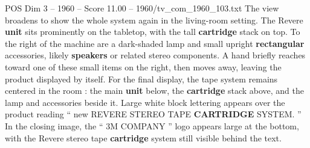 \begin{textsample}{POS Dim 3 – 1960 – Score 11.00 – 1960/tv\_com\_1960\_103.txt}
The view broadens to show the whole system again in the living-room setting.
The Revere \textbf{unit} sits prominently on the tabletop, with the tall \textbf{cartridge} stack on top.
To the right of the machine are a dark-shaded lamp and small upright \textbf{rectangular} accessories, likely \textbf{speakers} or related stereo components.
A hand briefly reaches toward one of these small items on the right, then moves away, leaving the product displayed by itself.
For the final display, the tape system remains centered in the room : the main \textbf{unit} below, the \textbf{cartridge} stack above, and the lamp and accessories beside it.
Large white block lettering appears over the product reading “ new REVERE STEREO TAPE \textbf{CARTRIDGE} SYSTEM. ” In the closing image, the “ 3M COMPANY ” logo appears large at the bottom, with the Revere stereo tape \textbf{cartridge} system still visible behind the text.

\end{textsample}
